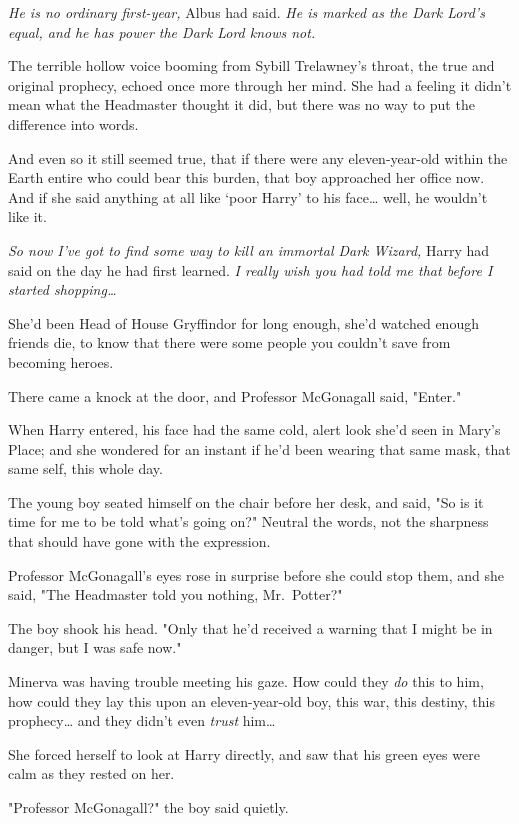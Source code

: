 \emph{He is no ordinary first-year,} Albus had said. \emph{He is marked as the 
Dark Lord's equal, and he has power the Dark Lord knows not.}

The terrible hollow voice booming from Sybill Trelawney's throat, the true and 
original prophecy, echoed once more through her mind. She had a feeling it 
didn't mean what the Headmaster thought it did, but there was no way to put the 
difference into words.

And even so it still seemed true, that if there were any eleven-year-old within 
the Earth entire who could bear this burden, that boy approached her office 
now. And if she said anything at all like `poor Harry' to his face{\ldots} 
well, he wouldn't like it.

\emph{So now I've got to find some way to kill an immortal Dark Wizard,} Harry 
had said on the day he had first learned. \emph{I really wish you had told me 
that before I started shopping{\ldots}}

She'd been Head of House Gryffindor for long enough, she'd watched enough 
friends die, to know that there were some people you couldn't save from 
becoming heroes.

There came a knock at the door, and Professor McGonagall said, "Enter."

When Harry entered, his face had the same cold, alert look she'd seen in Mary's 
Place; and she wondered for an instant if he'd been wearing that same mask, 
that same self, this whole day.

The young boy seated himself on the chair before her desk, and said, "So is it 
time for me to be told what's going on?" Neutral the words, not the sharpness 
that should have gone with the expression.

Professor McGonagall's eyes rose in surprise before she could stop them, and 
she said, "The Headmaster told you nothing, Mr.~Potter?"

The boy shook his head. "Only that he'd received a warning that I might be in 
danger, but I was safe now."

Minerva was having trouble meeting his gaze. How could they \emph{do} this to 
him, how could they lay this upon an eleven-year-old boy, this war, this 
destiny, this prophecy{\ldots} and they didn't even \emph{trust} him{\ldots}

She forced herself to look at Harry directly, and saw that his green eyes were 
calm as they rested on her.

"Professor McGonagall?" the boy said quietly.

